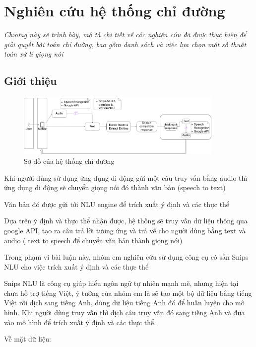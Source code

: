 \chapter{Nghiên cứu hệ thống chỉ đường}
\label{Chapter3}

\emph{Chương này sẽ trình bày, mô tả chi tiết về các nghiên cứu đã được thực hiện để giải quyết bài toán chỉ đường, bao gồm danh sách và việc lựa chọn một số thuật toán xử lí giọng nói}

\section{Giới thiệu}
   \begin{figure}[htp]
              \centering
              \includegraphics[width=10cm]{images/Structure-description.png} 
              \caption{Sơ đồ của hệ thống chỉ đường}
              \label{fig:sodohethongchiduong}

          \end{figure}
          
          
Khi người dùng sử dụng ứng dụng di động gửi một câu truy vấn bằng audio thì ứng dụng di động sẽ chuyển giọng nói đó thành văn bản (speech to text)

Văn bản đó được gửi tới NLU engine để trích xuất ý định và các thực thể


Dựa trên ý định và thực thể nhận được, hệ thống sẽ truy vấn dữ liệu thông qua google API, tạo ra câu trả lời tương ứng và trả về cho người dùng bằng text và audio ( text to speech để chuyển văn bản thành giọng nói)


Trong phạm vi bài luận này, nhóm em nghiên cứu sử dụng công cụ có sẵn Snips NLU cho việc trích xuất ý định và các thực thể


Snips NLU là công cụ giúp hiểu ngôn ngữ tự nhiên mạnh mẽ, nhưng hiện tại chưa hỗ trợ tiếng Việt, ý tưởng của nhóm em là sẽ tạo một bộ dữ liệu bằng tiếng Việt rồi dịch sang tiếng Anh, dùng dữ liệu tiếng Anh đó để huấn luyện cho mô hình. Khi người dùng truy vấn thì dịch câu truy vấn đó sang tiếng Anh và đưa vào mô hình để trích xuất ý định và các thực thể.


Về mặt dữ liệu:

